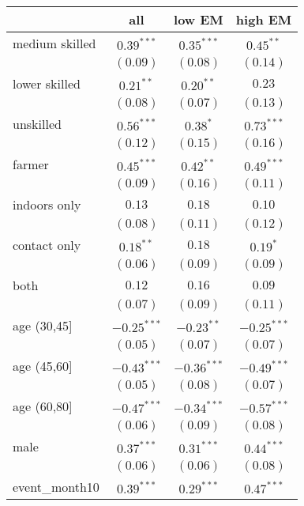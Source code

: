 
\begin{table}
\begin{center}
\begin{tabular}{l c c c}
\hline
 & all & low EM & high EM \\
\hline
medium skilled & $0.39^{***}$  & $0.35^{***}$  & $0.45^{**}$   \\
               & $(0.09)$      & $(0.08)$      & $(0.14)$      \\
lower skilled  & $0.21^{**}$   & $0.20^{**}$   & $0.23$        \\
               & $(0.08)$      & $(0.07)$      & $(0.13)$      \\
unskilled      & $0.56^{***}$  & $0.38^{*}$    & $0.73^{***}$  \\
               & $(0.12)$      & $(0.15)$      & $(0.16)$      \\
farmer         & $0.45^{***}$  & $0.42^{**}$   & $0.49^{***}$  \\
               & $(0.09)$      & $(0.16)$      & $(0.11)$      \\
indoors only   & $0.13$        & $0.18$        & $0.10$        \\
               & $(0.08)$      & $(0.11)$      & $(0.12)$      \\
contact only   & $0.18^{**}$   & $0.18$        & $0.19^{*}$    \\
               & $(0.06)$      & $(0.09)$      & $(0.09)$      \\
both           & $0.12$        & $0.16$        & $0.09$        \\
               & $(0.07)$      & $(0.09)$      & $(0.11)$      \\
age (30,45]    & $-0.25^{***}$ & $-0.23^{**}$  & $-0.25^{***}$ \\
               & $(0.05)$      & $(0.07)$      & $(0.07)$      \\
age (45,60]    & $-0.43^{***}$ & $-0.36^{***}$ & $-0.49^{***}$ \\
               & $(0.05)$      & $(0.08)$      & $(0.07)$      \\
age (60,80]    & $-0.47^{***}$ & $-0.34^{***}$ & $-0.57^{***}$ \\
               & $(0.06)$      & $(0.09)$      & $(0.08)$      \\
male           & $0.37^{***}$  & $0.31^{***}$  & $0.44^{***}$  \\
               & $(0.06)$      & $(0.06)$      & $(0.08)$      \\
event\_month10 & $0.39^{***}$  & $0.29^{***}$  & $0.47^{***}$  \\

\end{tabular}
\end{center}
\end{table}
